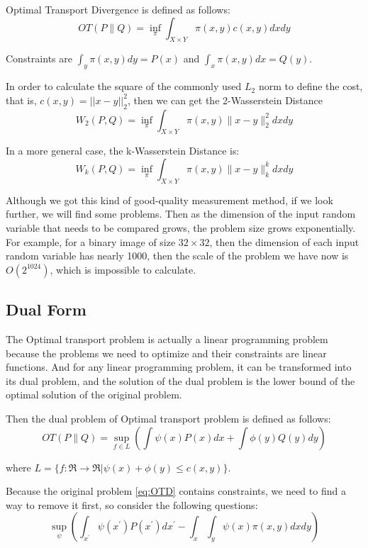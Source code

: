 Optimal Transport Divergence is defined as follows:
\begin{equation}
  \label{eq:OTD}
  O T(P \| Q)=\inf _{\pi} \int_{X \times Y} \pi(x, y) c(x, y) d x d y  
\end{equation}

Constraints are $\int_{y} \pi(x, y) d y=P(x)$ and $\int_{x} \pi(x, y) d x=Q(y)$.

In order to calculate the square of the commonly used $L_2$ norm to define the cost, that is, $c(x,y) = ||x - y||_2^2$, then we can get the 2-Wasserstein Distance
\begin{equation}
  W_{2}(P, Q)=\inf _{\pi} \int_{X \times Y} \pi(x, y)\|x-y\|_{2}^{2} d x d y  
\end{equation}

In a more general case, the k-Wasserstein Distance is:
\begin{equation}
  W_{k}(P, Q)=\inf _{\pi} \int_{X \times Y} \pi(x, y)\|x-y\|_{k}^{k} d x d y  
\end{equation}

Although we got this kind of good-quality measurement method, if we look further, we will find some problems. Then as the dimension of the input random variable that needs to be compared grows, the problem size grows exponentially. For example, for a binary image of size $32 \times 32$, then the dimension of each input random variable has nearly 1000, then the scale of the problem we have now is $O(2^{1024})$, which is impossible to calculate.

\subsection{Dual Form}
The Optimal transport problem is actually a linear programming problem because the problems we need to optimize and their constraints are linear functions. And for any linear programming problem, it can be transformed into its dual problem, and the solution of the dual problem is the lower bound of the optimal solution of the original problem.

Then the dual problem of Optimal transport problem is defined as follows:
\begin{equation}
  OT(P \| Q)=\sup _{f \in L}\left(\int \psi(x) P(x) d x+\int \phi(y) Q(y) d y\right)  
\end{equation}

where $L=\{f: \mathfrak{R} \rightarrow \mathfrak{R} | \psi(x)+\phi(y) \leq c(x, y)\}$.

Because the original problem \ref{eq:OTD} contains constraints, we need to find a way to remove it first, so consider the following questions:
\begin{equation}
    \label{eq:p2}
  \sup _{\psi}\left(\int_{x^{\prime}} \psi\left(x^{\prime}\right) P\left(x^{\prime}\right) d x^{\prime}-\int_{x} \int_{y} \psi(x) \pi(x, y) d x d y\right)
\end{equation}

